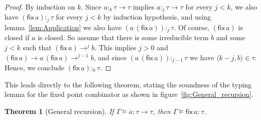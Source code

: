\documentclass[12pt,a4paper,draft]{article}
\theoremstyle{definition}
\theoremstyle{plain}
\newtheorem{theorem}[definition]{Theorem}
\newcommand{\app}[2]{\ensuremath{{#1}\,{#2}}}
\newcommand{\fix}[1]{\ensuremath{\mathsf{fix}\,{#1}}}
\newcommand{\pair}[1]{\ensuremath{\langle{#1}\rangle}}
\begin{document}
\begin{proof}
  By induction on $k$. Since $a :_k \tau \to \tau$ implies $a :_j \tau \to \tau$ for every $j < k$,
  we also have $(\fix{a}) :_j \tau$ for every $j < k$ by induction hypothesis, and using lemma~\ref{lem:Application}
  we also have $(\app{a}{(\fix{a})}) :_j \tau$. Of course, $(\fix{a})$ is closed if $a$ is closed.
  So assume that there is some irreducible term $b$ and some $j < k$ such that $(\fix{a}) \to^j b$.
  This implies $j > 0$ and $(\fix{a}) \to \app{a}{(\fix{a})} \to^{j-1} b$, and since
  $(\app{a}{(\fix{a})}) :_{j-1} \tau$ we have $\pair{k-j,b} \in \tau$. Hence, we conclude
  $(\fix{a}) :_k \tau$.
\end{proof}

This leads directly to the following theorem, stating the soundness of the typing lemma
for the fixed point combinator as shown in figure~\ref{fig:General_recursion}.

\begin{theorem}[General recursion]
  If $\Gamma \models a : \tau \to \tau$, then $\Gamma \models \fix{a} : \tau$.
\end{theorem}




\end{document}
